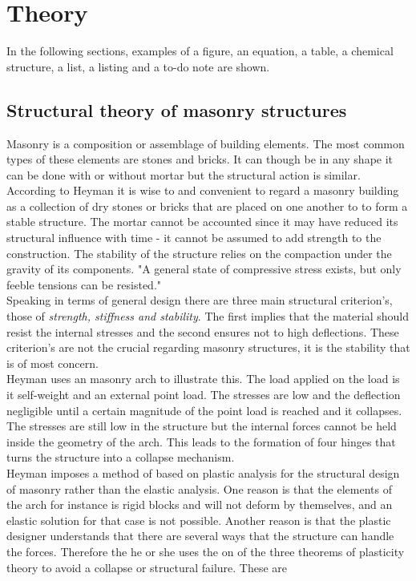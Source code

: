 \chapter{Theory}

In the following sections, examples of a figure, an equation, a table, a chemical structure, a list, a listing and a to-do note are shown.

\section{Structural theory of masonry structures}

Masonry is a composition or assemblage of building elements. The most common types of these elements are stones and bricks. It can though be in any shape it can be done with or without mortar but the structural action is similar. According to Heyman it is wise to and convenient to regard a masonry building as a collection of dry stones or bricks that are placed on one another to to form a stable structure. The mortar cannot be accounted since it may have reduced its structural influence with time - it cannot be assumed to add strength to the construction. The stability of the structure relies on the compaction under the gravity of its components. "A general state of compressive stress exists, but only feeble tensions can be resisted."\\


Speaking in terms of general design there are three main structural criterion's, those of \textit{strength, stiffness and stability}. The first implies that the material should resist the internal stresses and the second ensures not to high deflections. These criterion's are not the crucial regarding masonry structures, it is the stability that is of most concern.\\

Heyman uses an masonry arch to illustrate this. The load applied on the load is it self-weight and an external point load. The stresses are low and the deflection negligible until a certain magnitude of the point load is reached and it collapses. The stresses are still low in the structure but the internal forces cannot be held inside the geometry of the arch. This leads to the formation of four hinges that turns the structure into a collapse mechanism.\\   

Heyman imposes a method of based on plastic analysis for the structural design of masonry rather than the elastic analysis. One reason is that the elements of the arch for instance is rigid blocks and will not deform by themselves, and an elastic solution for that case is not possible. Another reason is that the plastic designer understands that there are several ways that the structure can handle the forces. Therefore the he or she uses the on of the three theorems of plasticity theory to avoid a collapse or structural failure. These are 

